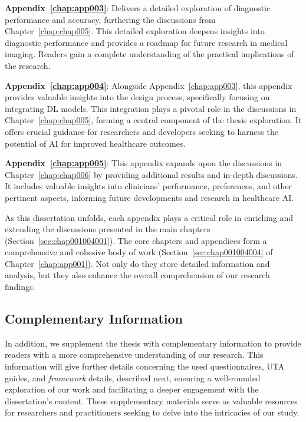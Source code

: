 \vspace{2.00mm}

\noindent
{\bf Appendix~\ref{chap:app003}}:
Delivers a detailed exploration of diagnostic performance and accuracy, furthering the discussions from Chapter~\ref{chap:chap005}.
This detailed exploration deepens insights into diagnostic performance and provides a roadmap for future research in medical imaging.
Readers gain a complete understanding of the practical implications of the research.

\vspace{2.00mm}

\noindent
{\bf Appendix~\ref{chap:app004}}:
Alongside Appendix~\ref{chap:app003}, this appendix provides valuable insights into the design process, specifically focusing on integrating \ac{DL} models.
This integration plays a pivotal role in the discussions in Chapter~\ref{chap:chap005}, forming a central component of the thesis exploration.
It offers crucial guidance for researchers and developers seeking to harness the potential of \ac{AI} for improved healthcare outcomes.

\vspace{2.00mm}

\noindent
{\bf Appendix~\ref{chap:app005}}:
This appendix expands upon the discussions in Chapter~\ref{chap:chap006} by providing additional results and in-depth discussions.
It includes valuable insights into clinicians' performance, preferences, and other pertinent aspects, informing future developments and research in healthcare \ac{AI}.

As this dissertation unfolds, each appendix plays a critical role in enriching and extending the discussions presented in the main chapters (Section~\ref{sec:chap001004001}).
The core chapters and appendices form a comprehensive and cohesive body of work (Section~\ref{sec:chap001004004} of Chapter~\ref{chap:app001}).
Not only do they store detailed information and analysis, but they also enhance the overall comprehension of our research findings.

\subsection{Complementary Information}
\label{sec:chap001004003}

In addition, we supplement the thesis with complementary information to provide readers with a more comprehensive understanding of our research.
This information will give further details concerning the used questionnaires, \ac{UTA} guides, and {\it framework} details, described next, ensuring a well-rounded exploration of our work and facilitating a deeper engagement with the dissertation's content.
These supplementary materials serve as valuable resources for researchers and practitioners seeking to delve into the intricacies of our study.

